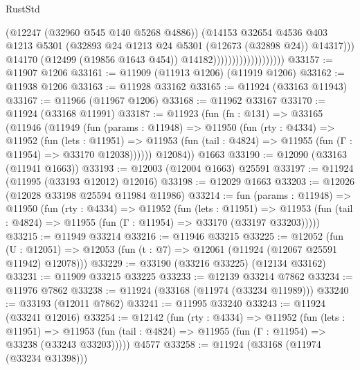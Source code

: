 \begin{lexlean}{RustStd}
\begin{coremodule}
                                            (@12247 (@32960 @545 @140 @5268 @4886))
                                            (@14153
                                              @32654
                                              @4536
                                              @403
                                              @1213
                                              @5301
                                              (@32893
                                                @24
                                                @1213
                                                @24
                                                @5301
                                                (@12673 (@32898 @24))
                                                @14317)))
                                          @14170
                                          (@12499 (@19856 @1643 @454))
                                          @14182)))))))))))))))))))
@33157 := @11907 @1206
@33161 := @11909 (@11913 @1206) (@11919 @1206)
@33162 := @11938 @1206
@33163 := @11928 @33162
@33165 := @11924 (@33163 @11943)
@33167 := @11966 (@11967 @1206)
@33168 := @11962 @33167
@33170 := @11924 (@33168 @11991)
@33187 := @11923
    (fun (fn : @131) =>
    @33165
      (@11946
        (@11949
          (fun (params : @11948) =>
          @11950
            (fun (rty : @4334) =>
            @11952
              (fun (lets : @11951) =>
              @11953 (fun (tail : @4824) => @11955 (fun (Γ : @11954) => @33170 @12038))))))
        @12084))
    @1663
@33190 := @12090 (@33163 (@11941 @1663))
@33193 := @12003 (@12004 @1663) @25591
@33197 := @11924 (@11995 (@33193 @12012) @12016)
@33198 := @12029 @1663
@33203 := @12026 (@12028 @33198 @25594 @11984 @11986)
@33214 := fun (params : @11948) =>
  @11950
    (fun (rty : @4334) =>
    @11952
      (fun (lets : @11951) =>
      @11953 (fun (tail : @4824) => @11955 (fun (Γ : @11954) => @33170 (@33197 @33203)))))
@33215 := @11949 @33214
@33216 := @11946 @33215
@33225 := @12052
    (fun (U : @12051) => @12053 (fun (t : @7) => @12061 (@11924 (@12067 @25591 @11942) @12078)))
@33229 := @33190 (@33216 @33225) (@12134 @33162)
@33231 := @11909 @33215 @33225
@33233 := @12139 @33214 @7862
@33234 := @11976 @7862
@33238 := @11924 (@33168 (@11974 (@33234 @11989)))
@33240 := @33193 (@12011 @7862)
@33241 := @11995 @33240
@33243 := @11924 (@33241 @12016)
@33254 := @12142
    (fun (rty : @4334) =>
    @11952
      (fun (lets : @11951) =>
      @11953 (fun (tail : @4824) => @11955 (fun (Γ : @11954) => @33238 (@33243 @33203)))))
    @4577
@33258 := @11924 (@33168 (@11974 (@33234 @31398)))

\end{coremodule}
\end{lexlean}
